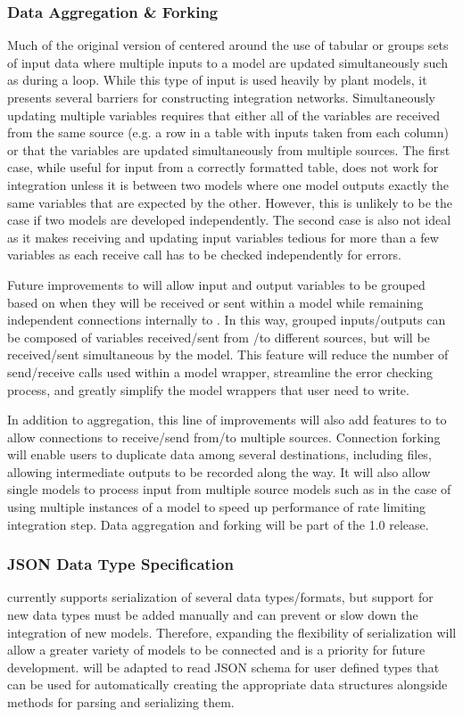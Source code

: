 \documentclass[journal]{IEEEtran}
\newcommand{\todo}[1]{{\color{red}{#1}}}
\newcommand{\pkg}{{\tt \todo{cis\_interface}}{}}
\begin{document}
\subsubsection{Data Aggregation \& Forking}\label{SS:dataagg}
%
Much of the original version of {\pkg} centered around the use of tabular or groups sets of input data where multiple inputs to a model are updated simultaneously such as during a loop. While this type of input is used heavily by plant models, it presents several barriers for constructing integration networks. Simultaneously updating multiple variables requires that either all of the variables are received from the same source (e.g. a row in a table with inputs taken from each column) or that the variables are updated simultaneously from multiple sources. The first case, while useful for input from a correctly formatted table, does not work for integration unless it is between two models where one model outputs exactly the same variables that are expected by the other. However, this is unlikely to be the case if two models are developed independently. The second case is also not ideal as it makes receiving and updating input variables tedious for more than a few variables as each receive call has to be checked independently for errors. 

Future improvements to {\pkg} will allow input and output variables to be grouped based on when they will be received or sent within a model while remaining independent connections internally to {\pkg}. In this way, grouped inputs/outputs can be composed of variables received/sent from /to different sources, but will be received/sent simultaneous by the model. This feature will reduce the number of send/receive calls used within a model wrapper, streamline the error checking process, and greatly simplify the model wrappers that user need to write.

In addition to aggregation, this line of improvements will also add features to {\pkg} to allow connections to receive/send from/to multiple sources. Connection forking will enable users to duplicate data among several destinations, including files, allowing intermediate outputs to be recorded along the way. It will also allow single models to process input from multiple source models such as in the case of using multiple instances of a model to speed up performance of rate limiting integration step.
%
Data aggregation and forking will be part of the {\pkg} 1.0 release.

\subsubsection{JSON Data Type Specification}\label{SS:json}
%
{\pkg} currently supports serialization of several data types/formats, but support for new data types must be added manually and can prevent or slow down the integration of new models. Therefore, expanding the flexibility of {\pkg} serialization will allow a greater variety of models to be connected and is a priority for future development. {\pkg} will be adapted to read JSON schema \citep{jsonschema} for user defined types that can be used for automatically creating the appropriate data structures alongside methods for parsing and serializing them. 
\end{document}
